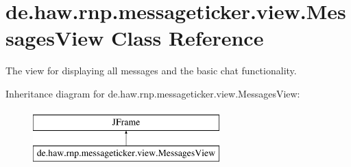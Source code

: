 \hypertarget{classde_1_1haw_1_1rnp_1_1messageticker_1_1view_1_1MessagesView}{\section{de.\-haw.\-rnp.\-messageticker.\-view.\-Messages\-View Class Reference}
\label{classde_1_1haw_1_1rnp_1_1messageticker_1_1view_1_1MessagesView}
}


The view for displaying all messages and the basic chat functionality.  


Inheritance diagram for de.\-haw.\-rnp.\-messageticker.\-view.\-Messages\-View\-:\begin{figure}[H]
\begin{center}
\leavevmode
\includegraphics[height=2.000000cm]{classde_1_1haw_1_1rnp_1_1messageticker_1_1view_1_1MessagesView}
\end{center}
\end{figure}
